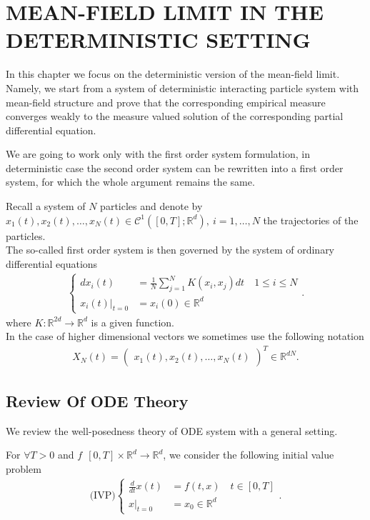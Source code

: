 \chapter{MEAN-FIELD LIMIT IN THE DETERMINISTIC SETTING}
In this chapter we focus on the deterministic version of the mean-field limit. Namely, we
start from a system of deterministic interacting particle system with mean-field structure
and prove that the corresponding empirical measure converges weakly to the measure valued solution of 
the corresponding partial differential equation. 

We are going to work only with the first order system formulation, in deterministic case the second order system can be rewritten into a first order system, for which the whole argument remains the same.

Recall a system of $N$ particles and denote by $x_{1}(t),x_{2}(t),\ldots,x_N(t) \in  \mathcal{C}^{1}([0,T];\mathbb{R}^{d} ),\ i=1,\ldots ,N $ 
  the trajectories of the particles.\\[1ex]
 The so-called first order system is then governed by the system of ordinary differential equations 
  \begin{align}\label{MPS1st}
    \begin{cases}
      d x_i(t) &= \frac{1}{N}\sum_{j=1}^{N} K(x_{i},x_{j}) dt  \quad 1\le i \le N \\
        x_i(t)\rvert_{t=0} &= x_i(0) \in \mathbb{R}^{d} 
    \end{cases}
  .\end{align}
  where $K : \mathbb{R}^{2d} \to \mathbb{R}^{d}  $ is a given function.\\[1ex]

In the case of higher dimensional vectors we sometimes  use the following notation 
 \begin{align*}
  X_N(t) = \begin{pmatrix} x_{1}(t),x_2(t),\ldots ,x_N(t) \end{pmatrix}^{T}  \in \mathbb{R}^{dN} 
 .\end{align*}
 
 
\section{Review Of ODE Theory}

We review the well-posedness theory of ODE system with a general setting.

For $\forall T > 0$ and $f\:\ [0,T] \times  \mathbb{R}^{d} \to \mathbb{R}^{d} $, we consider the following initial value problem
  \begin{align}\label{ivp}
    \text{(IVP)} \begin{cases}
     \frac{d}{dt} x(t) &= f(t,x) \quad t \in  [0,T]\\
     x \rvert_{t=0} &= x_{0} \in  \mathbb{R}^d
     \end{cases}
  .\end{align}

